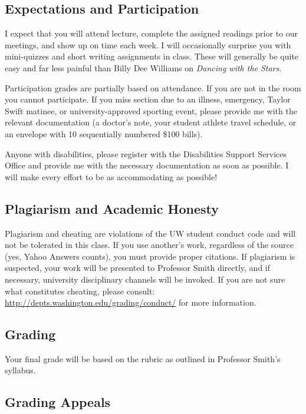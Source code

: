 \documentclass[12pt]{article}
\begin{document}
\subsection*{Expectations and Participation}

I expect that you will attend lecture, complete the assigned readings prior to our meetings, and show up on time each week. I will occasionally surprise you with mini-quizzes and short writing assignments in class. These will generally be quite easy and far less painful than Billy Dee Williams on \textit{Dancing with the Stars}.

Participation grades are partially based on attendance. If you are not in the room you cannot participate. If you miss section due to an illness, emergency, Taylor Swift matinee, or university-approved sporting event, please provide me with the relevant documentation (a doctor’s note, your student athlete travel schedule, or an envelope with 10 sequentially numbered \$100 bills). 

Anyone with disabilities, please register with the Disabilities Support Services Office and provide me with the necessary documentation as soon as possible. I will make every effort to be as accommodating as possible!

\subsection*{Plagiarism and Academic Honesty}

Plagiarism and cheating are violations of the UW student conduct code and will not be tolerated in this class. If you use another's work, regardless of the source (yes, Yahoo Answers counts), you must provide proper citations.  If plagiarism is suspected, your work will be presented to Professor Smith directly, and if necessary, university disciplinary channels will be invoked. If you are not sure what constitutes cheating, please consult: \url{http://depts.washington.edu/grading/conduct/} for more information. 

\subsection*{Grading}

Your final grade will be based on the rubric as outlined in Professor Smith's syllabus. 

\subsection*{Grading Appeals}
\end{document}
